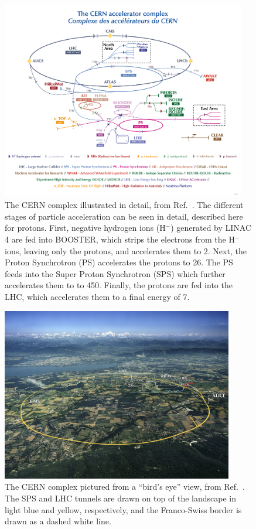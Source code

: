\begin{figure}[htb]
    \centering
    \includegraphics[width=0.95\textwidth]{fig/lhc/lhc_complex.png}
    \caption{
        The CERN complex illustrated in detail, from Ref.~\cite{Lopienska:2800984}. 
        The different stages of particle acceleration can be seen in detail, described here for protons. 
        First, negative hydrogen ions (H$^-$) generated by LINAC 4 are fed into BOOSTER, which strips the electrons from the H$^-$ ions, leaving only the protons, and accelerates them to 2\GeV. 
        Next, the Proton Synchrotron (PS) accelerates the protons to 26\GeV. 
        The PS feeds into the Super Proton Synchrotron (SPS) which further accelerates them to to 450\GeV. 
        Finally, the protons are fed into the LHC, which accelerates them to a final energy of 7\TeV. 
    }
    \label{fig:cern_complex}
\end{figure}

\begin{figure}[htb]
    \centering
    \includegraphics[width=0.9\textwidth]{fig/lhc/cern_aerial_view.jpg}
    \caption{
        The CERN complex pictured from a ``bird's eye'' view, from Ref.~\cite{Maximilien:1295244}. 
        The SPS and LHC tunnels are drawn on top of the landscape in light blue and yellow, respectively, and the Franco-Swiss border is drawn as a dashed white line. 
    }
    \label{fig:cern_aerial}
\end{figure}

